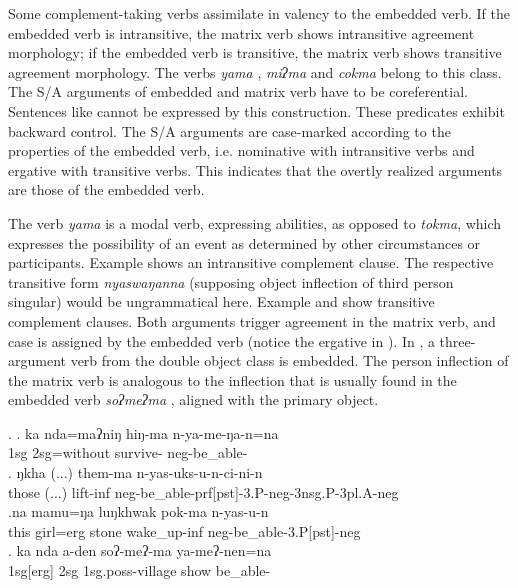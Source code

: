 Some complement-taking verbs assimilate in valency to the embedded verb. If the embedded verb is intransitive, the matrix verb shows intransitive agreement morphology; if the embedded verb is transitive, the matrix verb shows transitive agreement morphology. The verbs \emph{yama} , \emph{miʔma}  and \emph{cokma}  belong to this class. The S/A arguments of embedded and matrix verb have to be coreferential. Sentences like  cannot be expressed by this construction. These predicates exhibit backward control. The S/A arguments are case-marked according to the properties of the embedded verb, i.e. nominative with intransitive verbs and ergative with transitive verbs. This indicates that the overtly realized arguments are those of the embedded verb.

The verb \emph{yama} is a modal verb, expressing abilities, as opposed to \emph{tokma}, which expresses the possibility of an event as determined by other circumstances or participants. Example \Next[a] shows an intransitive complement clause. The respective transitive form \emph{nyaswaŋanna} (supposing  object inflection of third person singular) would be ungrammatical here. Example \Next[b] and \Next[c] show transitive complement clauses.  Both arguments trigger agreement in the matrix verb, and case is assigned by the embedded verb (notice the ergative in \Next[c]). In \Next[d], a three-argument verb from the double object class is embedded. The person inflection of the matrix verb is analogous to the inflection that is usually found in the embedded verb  \emph{soʔmeʔma} , aligned with the primary object.

\ex. \ag. ka nda=maʔniŋ hiŋ-ma n-ya-me-ŋa-n=na\\  
	 {\sc 1sg} {\sc 2sg=}without survive-  {\sc neg-}be\_able-\\
\bg. ŋkha (...) them-ma     n-yas-uks-u-n-ci-ni-n\\
those (...) lift{\sc -inf} {\sc neg-}be\_able{\sc -prf[pst]-3.P-neg-3nsg.P-3pl.A-neg}\\
\bg.na   mamu=ŋa   luŋkhwak pok-ma        n-yas-u-n\\
this girl{\sc =erg} stone wake\_up{\sc -inf} {\sc neg-}be\_able{\sc [3sg.A]-3.P[pst]-neg}\\
 
	\bg. ka nda a-den soʔ-meʔ-ma ya-meʔ-nen=na\\
	{\sc 1sg[erg]} {\sc 2sg} {\sc 1sg.poss}-village  show be\_able-\\
	
